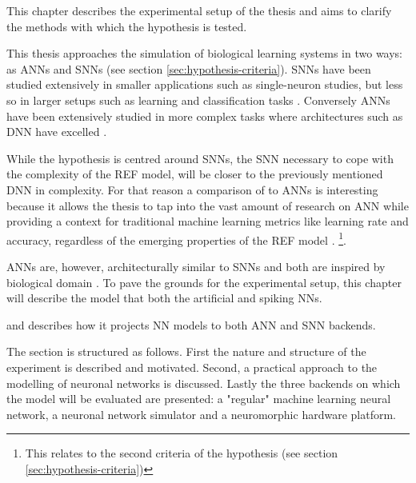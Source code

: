 This chapter describes the experimental setup of the thesis and aims to clarify the methods with which the hypothesis is tested.

This thesis approaches the simulation of biological learning systems in two ways: as \gls{ANN}s and \gls{SNN}s (see section \ref{sec:hypothesis-criteria}).
\gls{SNN}s have been studied extensively in smaller applications such as single-neuron studies, but less so in larger setups such as learning and classification tasks \autocite{dayan2001, Indiveri2015}.
Conversely \gls{ANN}s have been extensively studied in more complex tasks where architectures such as \gls{DNN} have excelled \autocite{schmidhuber2014, Nilsson2009, russel2007}.

While the hypothesis is centred around \gls{SNN}s, the \gls{SNN} necessary to cope with the complexity of the \gls{REF} model, will be closer to the previously mentioned \gls{DNN} in complexity.
For that reason a comparison of to \gls{ANN}s is interesting because it allows the thesis to tap into the vast amount of research on \gls{ANN} while providing a context for traditional machine learning metrics like learning rate and accuracy, regardless of the emerging properties of the REF model \autocite{schmidhuber2014, russel2007}.
\footnote{This relates to the second criteria of the hypothesis (see section \ref{sec:hypothesis-criteria})}.

\gls{ANN}s are, however, architecturally similar to \gls{SNN}s and both are inspired by biological domain \autocite{Nilsson2009, dayan2001}.
To pave the grounds for the experimental setup, this chapter will describe the model that  both the artificial and spiking \gls{NN}s.

 and describes how it projects \gls{NN} models to both ANN and SNN backends.

The section is structured as follows.
First the nature and structure of the experiment is described and motivated.
Second, a practical approach to the modelling of neuronal networks is discussed.
Lastly the three backends on which the model will be evaluated are presented:
  a "regular" machine learning neural network, a neuronal network simulator and a neuromorphic hardware platform.

